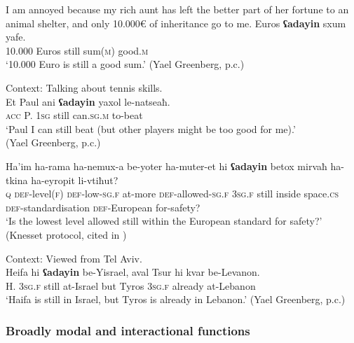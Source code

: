 \begin{exe}

	\ex\label{exAppendixHebrewAdayinMarginal1}
	\begin{xlist}
		 I am annoyed because my rich aunt has left the better part of her fortune to an animal shelter, and only 10.000€ of inheritance go to me.
		 Euros \textbf{ʕadayin} sxum yafe.\\
		10.000 Euros still sum(\textsc{m}) good.\textsc{m}\\
		\glt \lq 10.000 Euro is still a good sum.' (Yael Greenberg, p.c.)
	\end{xlist}
	
	\ex\label{exAppendixHebrewAdayinMarginal2}
	Context: Talking about tennis skills.\\
	\gll Et Paul ani \textbf{ʕadayin} yaxol le-natseaħ.\\
	\textsc{acc} P. 1\textsc{sg} still can.\textsc{sg}.\textsc{m} to-beat\\
	\glt \lq Paul I can still beat (but other players might be too good for me).'
	\\(Yael Greenberg, p.c.)
	
	\ex\label{exAppendixHebrewAdayinMarginal3}
	\gll Ha\rq{}im ha-rama ha-nemux-a be-yoter ha-muter-et hi \textbf{ʕadayin} betox mirvaħ ha-tkina ha-eyropit li-vtiħut?\\
	\textsc{q} \textsc{def}-level(\textsc{f}) \textsc{def}-low-\textsc{sg}.\textsc{f} at-more \textsc{def}-allowed-\textsc{sg}.\textsc{f} 3\textsc{sg}.\textsc{f} still inside space.\textsc{cs} \textsc{def}-standardisation \textsc{def}-European for-safety?\\
	\glt \lq Is the lowest level allowed still within the European standard for safety?' (Knesset protocol, cited in \cite[104 fn 21]{TsirkinSadan2019})
	
	\ex\label{exAppendixHebrewAdayinMarginal4}
	Context: Viewed from Tel Aviv.\\
	\gll Heifa hi \textbf{ʕadayin} be-Yisrael, aval Tsur hi kvar be-Levanon.\\
	H. 3\textsc{sg}.\textsc{f} still at-Israel but Tyros 3\textsc{sg}.\textsc{f} already at-Lebanon\\
	\glt \lq Haifa is still in Israel, but Tyros is already in Lebanon.\rq{ }(Yael Greenberg, p.c.)
\end{exe}

\subsubsection{Broadly modal and interactional functions}

